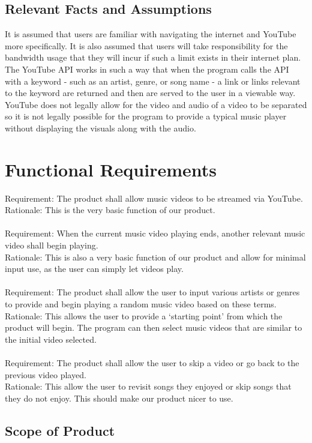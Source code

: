 \documentclass[12pt, titlepage]{article}
\begin{document}
\subsection{Relevant Facts and Assumptions}
It is assumed that users are familiar with navigating the internet and YouTube more specifically. It is also assumed that users will take responsibility for the bandwidth usage that they will incur if such a limit exists in their internet plan. The YouTube API works in such a way that when the program calls the API with a keyword - such as an artist, genre, or song name - a link or links relevant to the keyword are returned and then are served to the user in a viewable way. YouTube does not legally allow for the video and audio of a video to be separated so it is not legally possible for the program to provide a typical music player without displaying the visuals along with the audio.

\section{Functional Requirements}

Requirement: The product shall allow music videos to be streamed via YouTube.\\
Rationale: This is the very basic function of our product.\\\\
Requirement: When the current music video playing ends, another relevant music video shall begin playing.\\
Rationale: This is also a very basic function of our product and allow for minimal input use, as the user can simply let videos play.\\\\
Requirement: The product shall allow the user to input various artists or genres to provide and begin playing a random music video based on these terms.\\
Rationale: This allows the user to provide a ‘starting point’ from which the product will begin.  The program can then select music videos that are similar to the initial video selected.\\\\
Requirement: The product shall allow the user to skip a video or go back to the previous video played.\\
Rationale: This allow the user to revisit songs they enjoyed or skip songs that they do not enjoy.  This should make our product nicer to use.

\subsection{Scope of Product}
\end{document}
